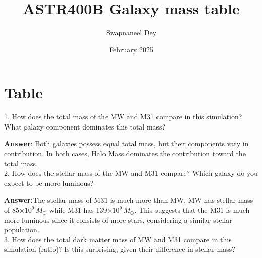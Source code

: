 \documentclass[12pt]{article}
\title{ASTR400B Galaxy mass table}
\author{Swapnaneel Dey}
\date{February 2025}
\begin{document}
\maketitle

\section{Table}

\begin{table}[ht!]
\centering
    \caption{Component and total mass table for MW, M31, M33. Mass are in the units of $10^{12}\,M_{\odot}$.  }
    \label{tab:my_label}
\end{table}

1. How does the total mass of the MW and M31 compare in this simulation? What galaxy component dominates this total mass?

\textbf{Answer}: Both galaxies possess equal total mass, but their components vary in contribution. In both cases, Halo Mass dominates the contribution toward the total mass. 
\\

2. How does the stellar mass of the MW and M31 compare? Which galaxy do you expect to be more luminous?

\textbf{Answer:}The stellar mass of M31 is much more than MW. MW has stellar mass of 85$\times10^{9}\,M_{\odot}$ while M31 has 139$\times10^{9}\,M_{\odot}$. This suggests that the M31 is much more luminous since it consists of more stars, considering a similar stellar population.
\\

3. How does the total dark matter mass of MW and M31 compare in this simulation (ratio)? Is this surprising, given their difference in stellar mass?
\end{document}
